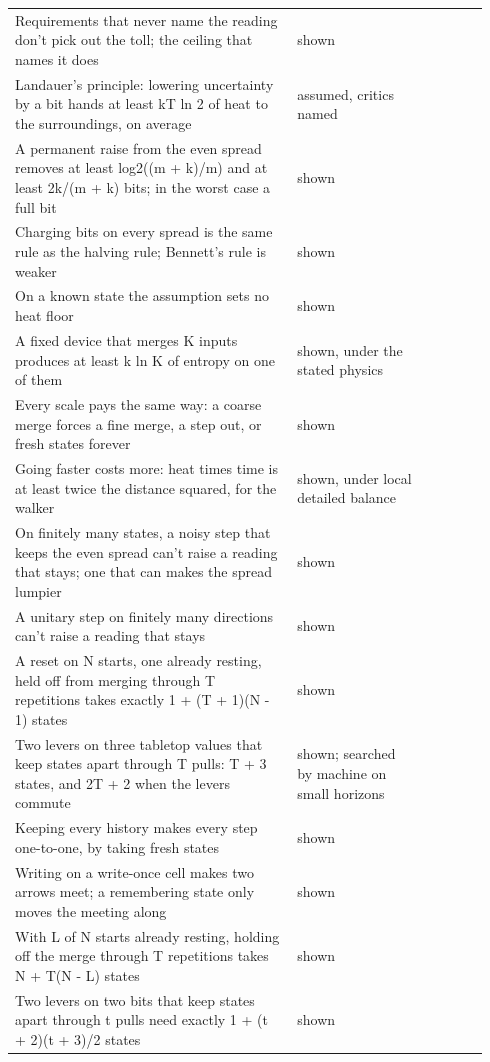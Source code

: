 \documentclass[11pt,twoside]{article}
\theoremstyle{thielethm}
\theoremstyle{thieledef}
\theoremstyle{thieledef}
\theoremstyle{thieledef}
\theoremstyle{thielethm}
\theoremstyle{thieleobs}
\theoremstyle{thielethm}
\begin{document}
\begin{longtable}{@{}>{\raggedright\arraybackslash}p{0.56\linewidth}>{\raggedright\arraybackslash}p{0.26\linewidth}>{\raggedright\arraybackslash}p{0.12\linewidth}@{}}
Requirements that never name the reading don't pick out the toll; the ceiling that names it does & shown & 19 \\
Landauer's principle: lowering uncertainty by a bit hands at least kT ln 2 of heat to the surroundings, on average & assumed, critics named & 20 \\
A permanent raise from the even spread removes at least log2((m + k)/m) and at least 2k/(m + k) bits; in the worst case a full bit & shown & 20 \\
Charging bits on every spread is the same rule as the halving rule; Bennett's rule is weaker & shown & 20 \\
On a known state the assumption sets no heat floor & shown & 20 \\
A fixed device that merges K inputs produces at least k ln K of entropy on one of them & shown, under the stated physics & 20 \\
Every scale pays the same way: a coarse merge forces a fine merge, a step out, or fresh states forever & shown & 20 \\
Going faster costs more: heat times time is at least twice the distance squared, for the walker & shown, under local detailed balance & 20 \\
On finitely many states, a noisy step that keeps the even spread can't raise a reading that stays; one that can makes the spread lumpier & shown & 21 \\
A unitary step on finitely many directions can't raise a reading that stays & shown & 21 \\
A reset on N starts, one already resting, held off from merging through T repetitions takes exactly 1 + (T + 1)(N - 1) states & shown & 21 \\
Two levers on three tabletop values that keep states apart through T pulls: T + 3 states, and 2T + 2 when the levers commute & shown; searched by machine on small horizons & 21 \\
Keeping every history makes every step one-to-one, by taking fresh states & shown & 21 \\
Writing on a write-once cell makes two arrows meet; a remembering state only moves the meeting along & shown & 21 \\
With L of N starts already resting, holding off the merge through T repetitions takes N + T(N - L) states & shown & 21 \\
Two levers on two bits that keep states apart through t pulls need exactly 1 + (t + 2)(t + 3)/2 states & shown & 21 \\

\end{longtable}
\end{document}
